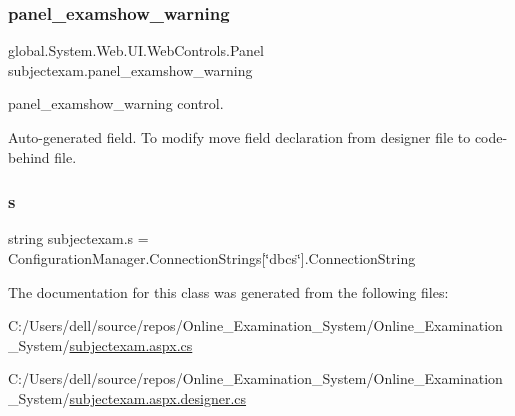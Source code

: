 \subsubsection{\texorpdfstring{panel\_examshow\_warning}{panel\_examshow\_warning}}
{\footnotesize\ttfamily global.\+System.\+Web.\+U\+I.\+Web\+Controls.\+Panel subjectexam.\+panel\+\_\+examshow\+\_\+warning\hspace{0.3cm}{\ttfamily [protected]}}



panel\+\_\+examshow\+\_\+warning control. 

Auto-\/generated field. To modify move field declaration from designer file to code-\/behind file. \mbox{\label{classsubjectexam_a24af485f0cbcbe2fdbf178cb10433dc6}} 
\subsubsection{\texorpdfstring{s}{s}}
{\footnotesize\ttfamily string subjectexam.\+s = Configuration\+Manager.\+Connection\+Strings\mbox{[}\char`\"{}dbcs\char`\"{}\mbox{]}.Connection\+String\hspace{0.3cm}{\ttfamily [private]}}



The documentation for this class was generated from the following files\+:\begin{DoxyCompactItemize}
\item 
C\+:/\+Users/dell/source/repos/\+Online\+\_\+\+Examination\+\_\+\+System/\+Online\+\_\+\+Examination\+\_\+\+System/\mbox{\hyperlink{subjectexam_8aspx_8cs}{subjectexam.\+aspx.\+cs}}\item 
C\+:/\+Users/dell/source/repos/\+Online\+\_\+\+Examination\+\_\+\+System/\+Online\+\_\+\+Examination\+\_\+\+System/\mbox{\hyperlink{subjectexam_8aspx_8designer_8cs}{subjectexam.\+aspx.\+designer.\+cs}}\end{DoxyCompactItemize}
